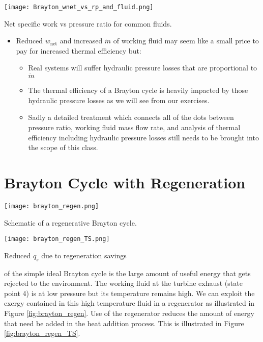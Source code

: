 \begin{marginfigure}
\texttt{[image: Brayton\_wnet\_vs\_rp\_and\_fluid.png]}
\caption{Net specific work vs pressure ratio for common fluids.}
\label{fig:wnet_vs_rp_fluid}
\end{marginfigure}


\begin{itemize}
\item Reduced $w_{\text{net}}$ and increased $\dot{m}$ of working fluid may seem like a small price to pay for increased thermal efficiency but:
\begin{itemize}
\item Real systems will suffer hydraulic pressure losses that are proportional to $\dot{m}$
\item The thermal efficiency of a Brayton cycle is heavily impacted by those hydraulic pressure losses as we will see from our exercises.
\item Sadly a detailed treatment which connects all of the dots between pressure ratio, working fluid mass flow rate, and analysis of thermal efficiency including hydraulic pressure losses still needs to be brought into the scope of this class.
\end{itemize} 

\end{itemize}

\section{Brayton Cycle with Regeneration}

\begin{marginfigure}
\texttt{[image: brayton\_regen.png]}
\caption{Schematic of a regenerative Brayton cycle.}
\label{fig:brayton_regen}
\end{marginfigure}
\begin{marginfigure}
\texttt{[image: brayton\_regen\_TS.png]}
\caption{Reduced $q_s$ due to regeneration savings}
\label{fig:brayton_regen_TS}
\end{marginfigure}

 of the simple ideal Brayton cycle is the large amount of useful energy that gets rejected to the environment.  The working fluid at the turbine exhaust (state point 4) is at low pressure but its temperature remains high.  We can exploit the exergy contained in this high temperature fluid in a regenerator as illustrated in Figure \ref{fig:brayton_regen}.  Use of the regenerator reduces the amount of energy that need be added in the heat addition process.  This is illustrated in Figure \ref{fig:brayton_regen_TS}.




